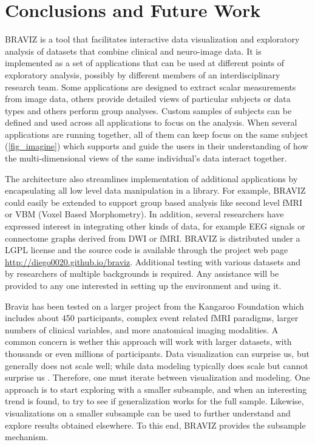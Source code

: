 \documentclass{frontiersHLTH}
\begin{document}
\section{Conclusions and Future Work}


BRAVIZ is a tool that facilitates interactive data visualization and exploratory analysis of datasets that combine clinical and neuro-image data. It is implemented as a set of applications that can be used at different points of exploratory analysis, possibly by different members of an interdisciplinary research team. Some applications are designed to extract scalar measurements from image data, others provide detailed views of particular subjects or data types and others perform group analyses. Custom samples of subjects can be defined and used across all applications to focus on the analysis. When several applications are running together, all of them can keep focus on the same subject (\ref{fig_imagine}) which supports and guide the users in their understanding of how the multi-dimensional views of the same individual's data interact together.

The architecture also streamlines implementation of additional applications by encapsulating all low level data manipulation in a library. For example, BRAVIZ could easily be extended to support group based analysis like second level fMRI or VBM (Voxel Based Morphometry). In addition, several researchers have expressed interest in integrating other kinds of data, for example EEG signals or connectome graphs derived from DWI or fMRI.  BRAVIZ is distributed under a LGPL license and the source code is available through the project web page \url{http://diego0020.github.io/braviz}. Additional testing with various datasets and by researchers of multiple backgrounds is required. Any assistance will be provided to any one interested in setting up the environment and using it. 

Braviz has been tested on a larger project from the Kangaroo Foundation which includes about 450 participants, complex event related fMRI paradigms, larger numbers of clinical variables, and more anatomical imaging modalities. A common concern is wether this approach will work with larger datasets, with thousands or even millions of participants. Data visualization can surprise us, but generally does not scale well; while data modeling typically does scale but cannot surprise us \cite{grolemund_r_2016}. Therefore, one must iterate between visualization and modeling. One approach is to start exploring with a smaller subsample, and when an interesting trend is found, to try to see if generalization works for the full sample. Likewise, visualizations on a smaller subsample can be used to further understand and explore results obtained elsewhere. To this end, BRAVIZ provides the subsample mechanism.
\end{document}
